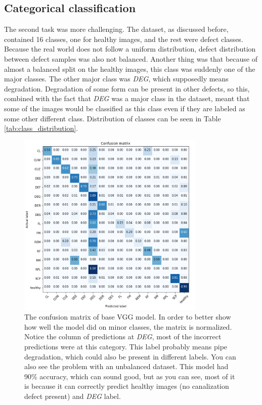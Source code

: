 \documentclass[thesis=B,english]{FITthesis}[2019/12/23]
\begin{document}
\subsection{Categorical classification}
The second task was more challenging. The dataset, as discussed before, contained 16 classes, one for healthy images, and the rest were defect classes. Because the real world does not follow a uniform distribution, defect distribution between defect samples was also not balanced. Another thing was that because of almost a balanced split on the healthy images, this class was suddenly one of the major classes. The other major class was \emph{DEG}, which supposedly means degradation. Degradation of some form can be present in other defects, so this, combined with the fact that \emph{DEG} was a major class in the dataset, meant that some of the images would be classified as this class even if they are labeled as some other different class. Distribution of classes can be seen in Table \ref{tab:class_distribution}. 
\begin{figure}
    \centering
    \includegraphics[width=0.8\textwidth]{CategoricalVGGBase.PNG}
    \caption[Confusion matrix of VGG model]{The confusion matrix of base VGG model. In order to better show how well the model did on minor classes, the matrix is normalized. Notice the column of predictions at \emph{DEG}, most of the incorrect predictions were at this category. This label probably means pipe degradation, which could also be present in different labels. You can also see the problem with an unbalanced dataset. This model had 90\% accuracy, which can sound good, but as you can see, most of it is because it can correctly predict healthy images (no canalization defect present) and \emph{DEG} label.}
    \label{fig:categorical_vgg_base}
\end{figure}
\end{document}
